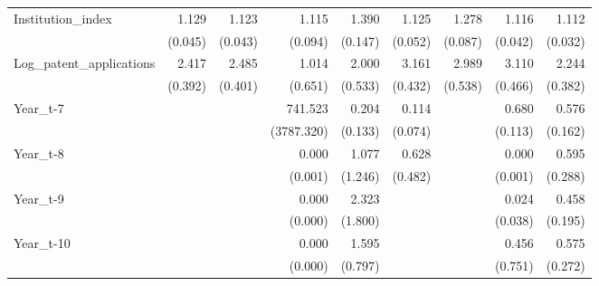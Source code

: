 \begin{table}[htbp]
\begin{tabular}{l*{8}{D{.}{.}{-1}}}
Institution\_index&       1.129\sym{***}&       1.123\sym{***}&       1.115         &       1.390\sym{***}&       1.125\sym{**} &       1.278\sym{***}&       1.116\sym{***}&       1.112\sym{***}\\
            &     (0.045)         &     (0.043)         &     (0.094)         &     (0.147)         &     (0.052)         &     (0.087)         &     (0.042)         &     (0.032)         \\
Log\_patent\_applications&       2.417\sym{***}&       2.485\sym{***}&       1.014         &       2.000\sym{***}&       3.161\sym{***}&       2.989\sym{***}&       3.110\sym{***}&       2.244\sym{***}\\
            &     (0.392)         &     (0.401)         &     (0.651)         &     (0.533)         &     (0.432)         &     (0.538)         &     (0.466)         &     (0.382)         \\
Year\_t-7    &                     &                     &     741.523         &       0.204\sym{**} &       0.114\sym{***}&                     &       0.680\sym{**} &       0.576\sym{*}  \\
            &                     &                     &  (3787.320)         &     (0.133)         &     (0.074)         &                     &     (0.113)         &     (0.162)         \\
Year\_t-8    &                     &                     &       0.000         &       1.077         &       0.628         &                     &       0.000\sym{***}&       0.595         \\
            &                     &                     &     (0.001)         &     (1.246)         &     (0.482)         &                     &     (0.001)         &     (0.288)         \\
Year\_t-9    &                     &                     &       0.000\sym{**} &       2.323         &                     &                     &       0.024\sym{**} &       0.458\sym{*}  \\
            &                     &                     &     (0.000)         &     (1.800)         &                     &                     &     (0.038)         &     (0.195)         \\
Year\_t-10   &                     &                     &       0.000         &       1.595         &                     &                     &       0.456         &       0.575         \\
            &                     &                     &     (0.000)         &     (0.797)         &                     &                     &     (0.751)         &     (0.272)         \\

\end{tabular}
\end{table}
